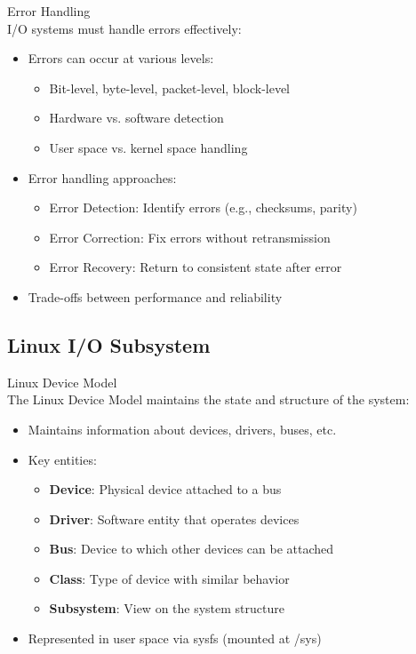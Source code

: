 \begin{definition}{Error Handling}\\
    I/O systems must handle errors effectively:
    \begin{itemize}
        \item Errors can occur at various levels:
            \begin{itemize}
                \item Bit-level, byte-level, packet-level, block-level
                \item Hardware vs. software detection
                \item User space vs. kernel space handling
            \end{itemize}
        \item Error handling approaches:
            \begin{itemize}
                \item Error Detection: Identify errors (e.g., checksums, parity)
                \item Error Correction: Fix errors without retransmission
                \item Error Recovery: Return to consistent state after error
            \end{itemize}
        \item Trade-offs between performance and reliability
    \end{itemize}
\end{definition}

\subsection{Linux I/O Subsystem}

\begin{definition}{Linux Device Model}\\
    The Linux Device Model maintains the state and structure of the system:
    \begin{itemize}
        \item Maintains information about devices, drivers, buses, etc.
        \item Key entities:
            \begin{itemize}
                \item \textbf{Device}: Physical device attached to a bus
                \item \textbf{Driver}: Software entity that operates devices
                \item \textbf{Bus}: Device to which other devices can be attached
                \item \textbf{Class}: Type of device with similar behavior
                \item \textbf{Subsystem}: View on the system structure
            \end{itemize}
        \item Represented in user space via sysfs (mounted at /sys)
    \end{itemize}
\end{definition}

